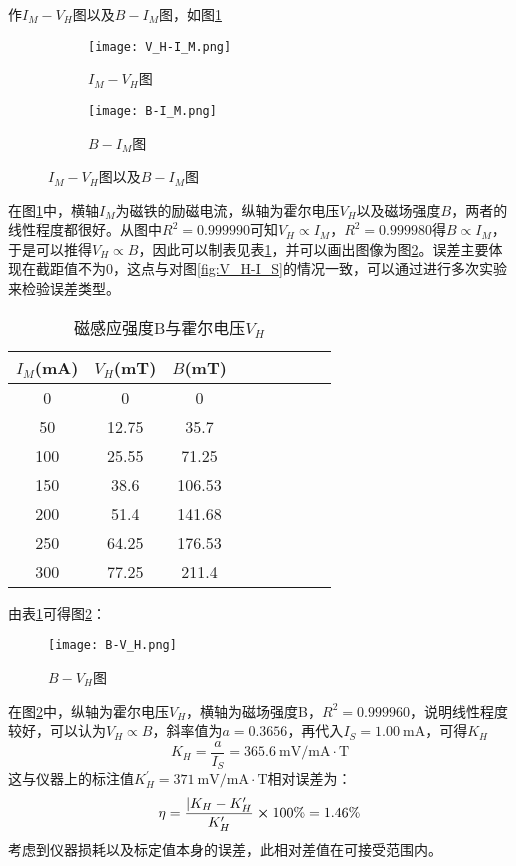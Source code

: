 \documentclass[11pt]{article}
\begin{document}
	
	作$I_M-V_H$图以及$B-I_M$图，如图\ref{fig:I_M}
	\begin{figure}[H]
		\centering
		\begin{subfigure}[t]{0.45\textwidth}  %
			\centering
			\texttt{[image: V\_H-I\_M.png]}  %
			\caption{$I_M-V_H$图}
		\end{subfigure}
		\begin{subfigure}[t]{0.45\textwidth}  %
			\centering
			\texttt{[image: B-I\_M.png]}  %
			\caption{$B-I_M$图}
		\end{subfigure}
		\caption{$I_M-V_H$图以及$B-I_M$图}
		\label{fig:I_M}
	\end{figure}
	
	在图\ref{fig:I_M}中，横轴$I_M$为磁铁的励磁电流，纵轴为霍尔电压$V_H$以及磁场强度$B$，两者的线性程度都很好。从图中$R^2=0.999990$可知$V_H \propto I_M$，$R^2=0.999980$得$B \propto I_M$，于是可以推得$V_H \propto B$，因此可以制表见表\ref{tab:B-V_H}，并可以画出图像为图\ref{fig:B-V_H}。误差主要体现在截距值不为0，这点与对图\ref{fig:V_H-I_S}的情况一致，可以通过进行多次实验来检验误差类型。
	\begin{table}[H]\centering
		\caption{磁感应强度B与霍尔电压$V_H$}
		\label{tab:B-V_H}
		\begin{tabular}{ccccccccc}
			\toprule
			$I_M$(mA) &  $V_H$(mT)& $B$(mT) \\
			\midrule
			0 & 0 & 0 \\
			50 & 12.75 & 35.7 \\
			100 & 25.55 & 71.25 \\
			150 & 38.6 & 106.53 \\
			200 & 51.4 & 141.68 \\
			250 & 64.25 & 176.53 \\
			300 & 77.25 & 211.4 \\
			\bottomrule
		\end{tabular}
	\end{table}
	
	由表\ref{tab:B-V_H}可得图\ref{fig:B-V_H}：
	\begin{figure}[H]
		\centering
		\texttt{[image: B-V\_H.png]}
		\caption{$B-V_H$图}
		\label{fig:B-V_H}
	\end{figure}
	
	在图\ref{fig:B-V_H}中，纵轴为霍尔电压$V_H$，横轴为磁场强度B，$R^2=0.999960$，说明线性程度较好，可以认为$V_H \propto B$，斜率值为$a=0.3656$，再代入$I_S=1.00\ \mathrm{mA}$，可得$K_H$
	\[K_H=\frac{a}{I_S}=365.6 \ \mathrm{mV/mA \cdot T}\]
	这与仪器上的标注值$K_H^{\prime}=371\ \mathrm{mV/mA \cdot T}$相对误差为：
	\[\eta=\frac{|K_H-K_H^{\prime}}{K_H^{\prime}} \cross 100\% = 1.46 \%\]
	考虑到仪器损耗以及标定值本身的误差，此相对差值在可接受范围内。
	
\end{document}

